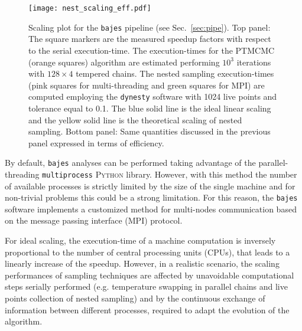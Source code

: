 \documentclass[prd,aps,twocolumn,a4paper,showkeys,nofootinbib,floatfix]{revtex4-1}
\newcommand{\bajes}{{\tt bajes}}
\newcommand{\py}{\textsc{Python}}
\begin{document}
\begin{figure}[t]
	\centering 
	\texttt{[image: nest\_scaling\_eff.pdf]}
	\caption{Scaling plot for the {\bajes} pipeline (see Sec.~\ref{sec:pipe}).
					Top panel: 
					The square markers are the measured
					speedup factors with respect to the serial execution-time.
					The execution-times for the PTMCMC (orange squares)
					algorithm are estimated performing $10^3$ iterations
					with $128\times 4$ tempered chains.
					The nested sampling execution-times  
					(pink squares for multi-threading 
					and green squares for MPI) are computed
					employing the {\tt dynesty} software 
					with 1024 live points and tolerance equal to 0.1.
						The blue solid line is the ideal linear scaling and
						the yellow solid line is the theoretical scaling of nested 
						sampling.
						Bottom panel:
						Same quantities discussed in the previous panel
						expressed in terms of efficiency.
						}
	\label{fig:scaling}
\end{figure}

By default, {\bajes} analyses can be performed
taking advantage of the parallel-threading {\tt multiprocess} {\py} library.
However, with this method the number of available processes is strictly 
limited by the size of the single machine 
and for non-trivial problems this could be a strong limitation.
For this reason, the {\bajes} software implements a customized method for multi-nodes
communication based on the message passing interface (MPI) protocol.

For ideal scaling, the execution-time of a machine computation is
inversely proportional to the number of central processing units (CPUs),
that leads to a linearly increase of the speedup.
However, in a realistic scenario, 
the scaling performances of sampling techniques 
are affected by unavoidable computational steps serially performed 
(e.g. temperature swapping in parallel chains and 
live points collection of nested sampling) and
by the continuous exchange of information 
between different processes,
required to adapt the evolution of the algorithm.
\end{document}

